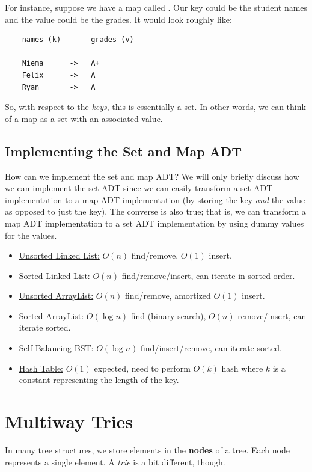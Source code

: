 \documentclass[letterpaper]{article}
\begin{document}
\bigskip 

For instance, suppose we have a map called . Our key could be the student names and the value could be the grades. It would look roughly like: 
\begin{verbatim}
    names (k)       grades (v)
    --------------------------
    Niema      ->   A+ 
    Felix      ->   A 
    Ryan       ->   A
\end{verbatim}
So, with respect to the \emph{keys}, this is essentially a set. In other words, we can think of a map as a set with an associated value. 

\subsection{Implementing the Set and Map ADT}
How can we implement the set and map ADT? We will only briefly discuss how we can implement the set ADT since we can easily transform a set ADT implementation to a map ADT implementation (by storing the key \emph{and} the value as opposed to just the key). The converse is also true; that is, we can transform a map ADT implementation to a set ADT implementation by using dummy values for the values. 

\begin{itemize}
    \item \underline{Unsorted Linked List:} $O(n)$ find/remove, $O(1)$ insert.
    \item \underline{Sorted Linked List:} $O(n)$ find/remove/insert, can iterate in sorted order. 
    \item \underline{Unsorted ArrayList:} $O(n)$ find/remove, amortized $O(1)$ insert. 
    \item \underline{Sorted ArrayList:} $O(\log n)$ find (binary search), $O(n)$ remove/insert, can iterate sorted. 
    \item \underline{Self-Balancing BST:} $O(\log n)$ find/insert/remove, can iterate sorted. 
    \item \underline{Hash Table:} $O(1)$ expected, need to perform $O(k)$ hash where $k$ is a constant representing the length of the key. 
\end{itemize}




\newpage 
\section{Multiway Tries}
In many tree structures, we store elements in the \textbf{nodes} of a tree. Each node represents a single element. A \emph{trie} is a bit different, though. 
\end{document}
